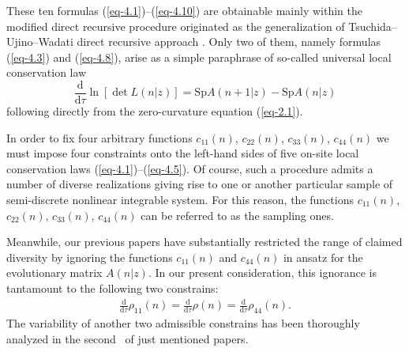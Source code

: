 \documentclass[10pt,a4paper]{amsart}
\numberwithin{equation}{section}
\begin{document}
These ten formulas (\ref{eq-4.1})--(\ref{eq-4.10}) are obtainable mainly within the modified direct recursive procedure \cite{vakhnenko-JNMP-18-401, vakhnenko-JNMP-18-415, vakhnenko-JNMP-20-606, vakhnenko-JMP-56-033505} originated as the generalization of Tsuchida--Ujino--Wadati direct recursive approach \cite{tsuchida-JMP-39-4785, tsuchida-JPA-32-2239}. Only two of them, namely formulas (\ref{eq-4.3}) and (\ref{eq-4.8}), arise as a simple paraphrase of so-called universal local conservation law
\begin{equation*}%
	\frac{\mathrm{d}}{\mathrm{d}\tau}\ln\left[\det L(n|z)\right]=\mathrm{Sp} A(n+1|z) -\mathrm{Sp} A(n|z)
\end{equation*}
following directly from the zero-curvature equation (\ref{eq-2.1}).

In order to fix four arbitrary functions $c_{11}(n)$, $c_{22}(n)$, $c_{33}(n)$, $c_{44}(n)$
we must impose four constraints onto the left-hand sides of five on-site local conservation laws (\ref{eq-4.1})--(\ref{eq-4.5}). Of course, such a procedure admits a number of diverse realizations giving rise to one or another particular sample of semi-discrete nonlinear integrable system. For this reason, the functions $c_{11}(n)$, $c_{22}(n)$, $c_{33}(n)$, $c_{44}(n)$ can be referred to as the sampling ones.

Meanwhile, our previous papers \cite{vakhnenko-JNMP-18-401, vakhnenko-JNMP-18-415} have substantially restricted the range of claimed diversity by ignoring the functions $c_{11}(n)$ and $c_{44}(n)$ in ansatz for the evolutionary matrix $A(n|z)$. In our present consideration, this ignorance is tantamount to the following two constrains:
\begin{gather*}%
\frac{\mathrm{d}}{\mathrm{d}\tau}\rho_{11}(n)=\frac{\mathrm{d}}{\mathrm{d}\tau}\rho(n) =\frac{\mathrm{d}}{\mathrm{d}\tau}\rho_{44}(n) .
\end{gather*}
The variability of another two admissible constrains has been thoroughly analyzed in the second~\cite{vakhnenko-JNMP-18-415} of just mentioned papers.
\end{document}
